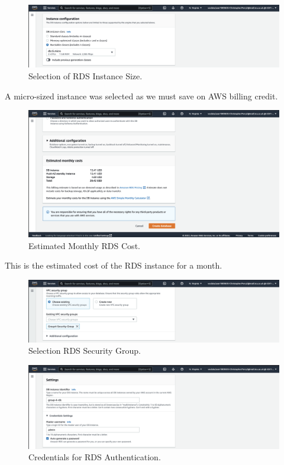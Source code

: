 \begin{figure}[!htbp]
    \centering
    \includegraphics[width=\textwidth]{resources/rds/rds-instance-config}
    \caption{Selection of RDS Instance Size.}
    \label{fig:rds-instance-conf}
\end{figure}

A micro-sized instance was selected as we must save on AWS billing credit.

\begin{figure}[!htbp]
    \centering
    \includegraphics[width=\textwidth]{resources/rds/rds-monthly-costs}
    \caption{Estimated Monthly RDS Cost.}
    \label{fig:rds-costs}
\end{figure}

This is the estimated cost of the RDS instance for a month.

\begin{figure}[!htbp]
    \centering
    \includegraphics[width=\textwidth]{resources/rds/rds-security-group}
    \caption{Selection RDS Security Group.}
    \label{fig:rds-security}
\end{figure}

\begin{figure}[!htbp]
    \centering
    \includegraphics[width=\textwidth]{resources/rds/rds-settings}
    \caption{Credentials for RDS Authentication.}
    \label{fig:rds-settings}
\end{figure}

